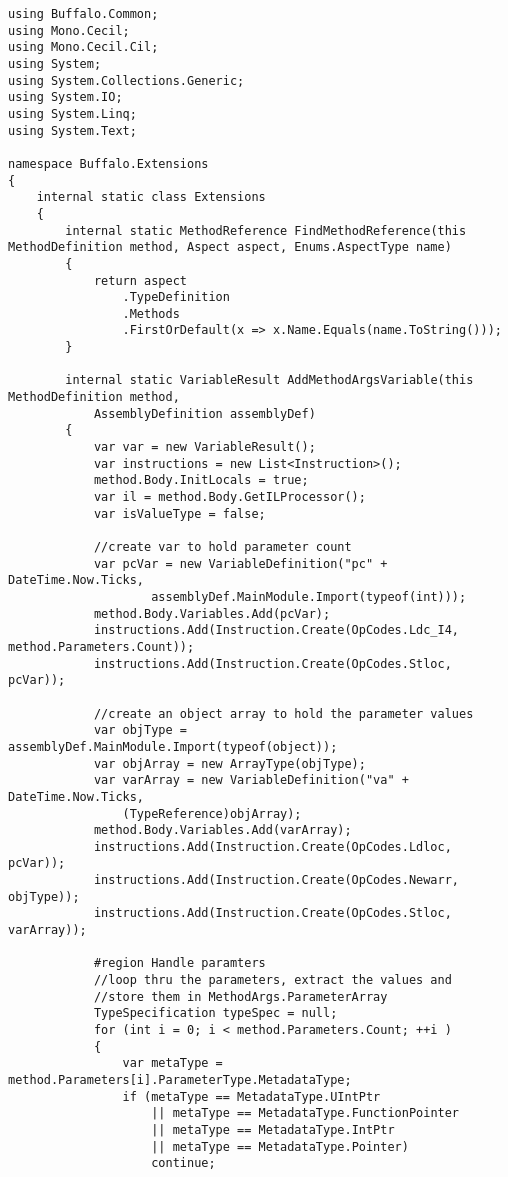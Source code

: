 \begin{lstlisting}[caption={../buffalo/Extensions/Extensions.cs}, label=../buffalo/Extensions/Extensions.cs, frame=tb, basicstyle=\scriptsize]﻿using Buffalo.Common;
using Mono.Cecil;
using Mono.Cecil.Cil;
using System;
using System.Collections.Generic;
using System.IO;
using System.Linq;
using System.Text;

namespace Buffalo.Extensions
{
    internal static class Extensions
    {
        internal static MethodReference FindMethodReference(this MethodDefinition method, Aspect aspect, Enums.AspectType name)
        {
            return aspect
                .TypeDefinition
                .Methods
                .FirstOrDefault(x => x.Name.Equals(name.ToString()));
        }

        internal static VariableResult AddMethodArgsVariable(this MethodDefinition method,
            AssemblyDefinition assemblyDef)
        {
            var var = new VariableResult();
            var instructions = new List<Instruction>();
            method.Body.InitLocals = true;
            var il = method.Body.GetILProcessor();
            var isValueType = false;

            //create var to hold parameter count
            var pcVar = new VariableDefinition("pc" + DateTime.Now.Ticks,
                    assemblyDef.MainModule.Import(typeof(int)));
            method.Body.Variables.Add(pcVar);
            instructions.Add(Instruction.Create(OpCodes.Ldc_I4, method.Parameters.Count));
            instructions.Add(Instruction.Create(OpCodes.Stloc, pcVar));

            //create an object array to hold the parameter values
            var objType = assemblyDef.MainModule.Import(typeof(object));
            var objArray = new ArrayType(objType);
            var varArray = new VariableDefinition("va" + DateTime.Now.Ticks,
                (TypeReference)objArray);
            method.Body.Variables.Add(varArray);
            instructions.Add(Instruction.Create(OpCodes.Ldloc, pcVar));
            instructions.Add(Instruction.Create(OpCodes.Newarr, objType));
            instructions.Add(Instruction.Create(OpCodes.Stloc, varArray));

            #region Handle paramters
            //loop thru the parameters, extract the values and 
            //store them in MethodArgs.ParameterArray
            TypeSpecification typeSpec = null;
            for (int i = 0; i < method.Parameters.Count; ++i )
            {
                var metaType = method.Parameters[i].ParameterType.MetadataType;
                if (metaType == MetadataType.UIntPtr
                    || metaType == MetadataType.FunctionPointer
                    || metaType == MetadataType.IntPtr
                    || metaType == MetadataType.Pointer)
                    continue;


\end{lstlisting}
